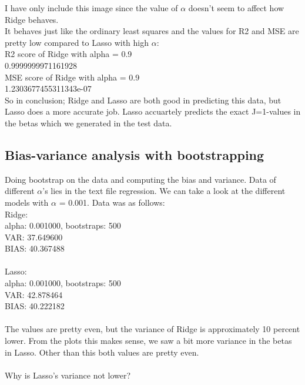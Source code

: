 \documentclass[a4paper,norsk]{article}
\begin{document}
I have only include this image since the value of $\alpha$ doesn't seem to affect how Ridge behaves.\\
It behaves just like the ordinary least squares and the values for R2 and MSE are pretty low compared to Lasso with high $\alpha$:\\
R2 score of Ridge with alpha = 0.9\\
0.9999999971161928\\
MSE score of Ridge with alpha = 0.9\\
1.2303677455311343e-07\\
So in conclusion; Ridge and Lasso are both good in predicting this data, but Lasso does a more accurate job. Lasso accuartely predicts the exact J=1-values in the betas which we generated in the test data.


\subsection{Bias-variance analysis with bootstrapping}
Doing bootstrap on the data and computing the bias and variance. Data of different $\alpha$'s lies in the text file regression. We can take a look at the different models with $\alpha$ = 0.001. Data was as follows:\\
Ridge:\\
alpha: 0.001000, bootstraps: 500\\
VAR: 37.649600\\
BIAS: 40.367488\\
\\
Lasso:\\
alpha: 0.001000, bootstraps: 500\\
VAR: 42.878464\\
BIAS: 40.222182\\
\\
The values are pretty even, but the variance of Ridge is approximately 10 percent lower. From the plots this makes sense, we saw a bit more variance in the betas in Lasso. Other than this both values are pretty even.
\\
\\Why is Lasso's variance not lower?



\clearpage
\end{document}
